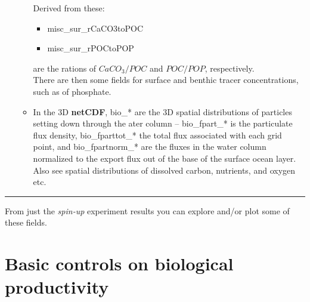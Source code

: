 \begin{itemize}[noitemsep]
\begin{itemize}[noitemsep]
\vspace{1mm}
Derived from these:
\vspace{1mm}
\begin{itemize}[noitemsep]
\item [] \textsf{\footnotesize misc\_sur\_rCaCO3toPOC}
\item [] \textsf{\footnotesize misc\_sur\_rPOCtoPOP}
\end{itemize}
are the rations of \(CaCO_{3}/POC\) and \(POC/POP\), respectively.
\vspace{1mm}
\\There are then some fields for surface and benthic tracer concentrations, such as of phosphate.
\vspace{1mm}
\item In the 3D \textbf{netCDF}, \textsf{\footnotesize bio\_*} are the 3D spatial distributions of particles setting down through the ater column -- \textsf{\footnotesize bio\_fpart\_*} is the particulate flux density, \textsf{\footnotesize bio\_fparttot\_*} the total flux associated with each grid point, and \textsf{\footnotesize bio\_fpartnorm\_*} are the fluxes in the water column normalized to the export flux out of the base of the surface ocean layer.
\vspace{1mm}
\\Also see spatial distributions of dissolved carbon, nutrients, and oxygen etc.
\end{itemize} 

\end{itemize}

\vspace{1mm}
\noindent\rule{4cm}{0.5pt}
\vspace{2mm}

\noindent From just the \textit{spin-up} experiment results you can explore and/or plot some of these fields.

\newpage

\section{Basic controls on biological productivity}


